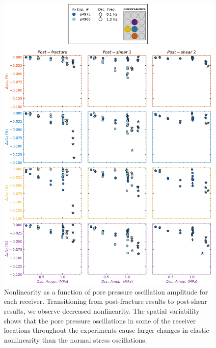 \documentclass[letterpaper,10pt]{article}
\begin{document}
\begin{figure}[ht]
	\centering
	\includegraphics[width=0.9\columnwidth]{Delc_bypair_all_PP}
	\caption{Nonlinearity as a function of pore pressure oscillation amplitude for each receiver. Transitioning from post-fracture results to post-shear results, we observe decreased nonlinearity. The spatial variability shows that the pore pressure oscillations in some of the receiver locations throughout the experiments cause larger changes in elastic nonlinearity than the normal stress oscillations.}
	\label{fig:delc_plots_pp}
\end{figure}

\clearpage
\end{document}
